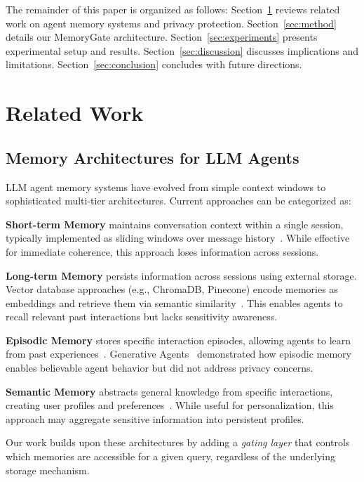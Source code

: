 \documentclass[conference]{IEEEtran}
\begin{document}
The remainder of this paper is organized as follows: Section~\ref{sec:related} reviews related work on agent memory systems and privacy protection. Section~\ref{sec:method} details our MemoryGate architecture. Section~\ref{sec:experiments} presents experimental setup and results. Section~\ref{sec:discussion} discusses implications and limitations. Section~\ref{sec:conclusion} concludes with future directions.

\section{Related Work}
\label{sec:related}

\subsection{Memory Architectures for LLM Agents}

LLM agent memory systems have evolved from simple context windows to sophisticated multi-tier architectures. Current approaches can be categorized as:

\textbf{Short-term Memory} maintains conversation context within a single session, typically implemented as sliding windows over message history~\cite{vaswani2017attention}. While effective for immediate coherence, this approach loses information across sessions.

\textbf{Long-term Memory} persists information across sessions using external storage. Vector database approaches (e.g., ChromaDB, Pinecone) encode memories as embeddings and retrieve them via semantic similarity~\cite{johnson2019billion, pinecone2023docs}. This enables agents to recall relevant past interactions but lacks sensitivity awareness.

\textbf{Episodic Memory} stores specific interaction episodes, allowing agents to learn from past experiences~\cite{mialon2023augmented}. Generative Agents~\cite{park2023generative} demonstrated how episodic memory enables believable agent behavior but did not address privacy concerns.

\textbf{Semantic Memory} abstracts general knowledge from specific interactions, creating user profiles and preferences~\cite{modarressi2022memorizing}. While useful for personalization, this approach may aggregate sensitive information into persistent profiles.

Our work builds upon these architectures by adding a \textit{gating layer} that controls which memories are accessible for a given query, regardless of the underlying storage mechanism.
\end{document}

